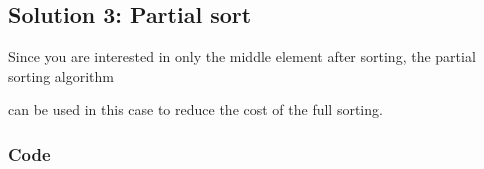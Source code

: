 \documentclass[letterpaper,12pt,english]{book}
\begin{document}
\subsection{Solution 3: Partial sort}
\label{\detokenize{Sorting/04_SORT_169_Majority_Element:solution-3-partial-sort}}
\sphinxAtStartPar
Since you are interested in only the middle element after sorting, the partial sorting algorithm %
\begin{footnote}[79]\sphinxAtStartFootnote
{}
%
\end{footnote} can be used in this case to reduce the cost of the full sorting.


\subsubsection{Code}
\label{\detokenize{Sorting/04_SORT_169_Majority_Element:id2}}
\end{document}
